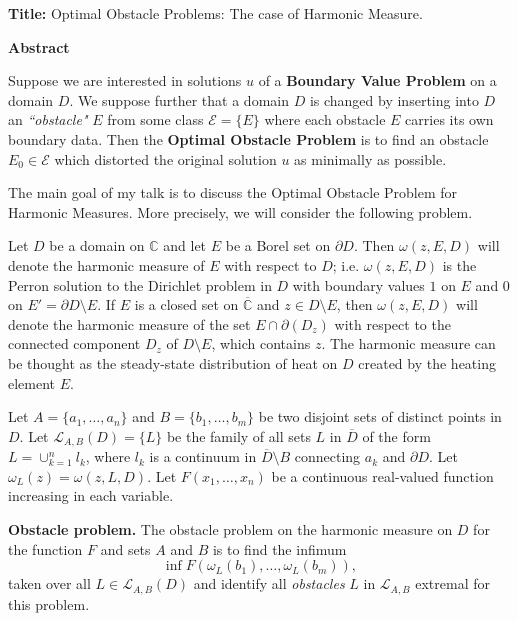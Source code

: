 \documentclass[10pt,a4paper,reqno]{amsart}
\theoremstyle{definition}
\theoremstyle{remark}
\begin{document}
\thispagestyle{empty}

{\Large{\textbf{Title:}}} {\large{Optimal Obstacle Problems: The
case of Harmonic Measure.}}

\bigskip


                 \centerline{{\Large{\textbf{Abstract}}}}
\medskip

\noindent %
Suppose we are interested in solutions $u$ of a \textbf{Boundary
Value Problem }on a domain $D$. We suppose further that a domain
$D$ is changed by inserting into $D$ an \emph{``obstacle"} $E$
from some class $\mathcal{E}=\{E\}$ where each obstacle $E$
carries its own boundary data. Then the \textbf{Optimal Obstacle
Problem} is to find an obstacle $E_0\in \mathcal{E}$ which
distorted the original solution $u$ as minimally as possible.

The main goal of my talk is to discuss the Optimal Obstacle
Problem for Harmonic Measures. More precisely, we will consider
the following problem.



 Let $D$ be a domain on $\mathbb{C}$ and let $E$ be a Borel set on
$\partial D$. Then $\omega(z,E,D)$ will denote the harmonic
measure of $E$ with respect to $D$; i.e. $\omega(z,E,D)$ is the
Perron solution to the Dirichlet problem in $D$ with boundary
values $1$ on $E$ and $0$ on $E'=\partial D\setminus E$. If $E$ is
a closed set on $\overline{\mathbb{C}}$ and $z\in D\setminus E$,
then $\omega(z,E,D)$ will denote the harmonic measure of the set
$E\cap\partial(D_z)$ with respect to the connected component $D_z$
of $D\setminus E$, which contains $z$. The harmonic measure can be
thought as the steady-state distribution of heat on $D$ created by
the heating element $E$.

 Let $A=\{a_1,\ldots,a_n\}$ and $B=\{b_1,\ldots,b_m\}$ be
two disjoint sets of distinct points in $D$. Let
${\mathcal{L}}_{A,B}(D)=\{L\}$ be the family of all  sets $L$ in
$\overline{D}$ of the form $L=\cup_{k=1}^n l_k$, where $l_k$ is a
continuum in $\overline{D}\setminus B$ connecting $a_k$ and
$\partial D$. Let $\omega_L(z)=\omega(z,L,D)$. Let
$F(x_1,\ldots,x_n)$ be a continuous real-valued function
increasing in each variable.

\smallskip

\noindent %
 \textbf{Obstacle problem. } %
 The obstacle problem on the
harmonic measure on $D$ for the function $F$ and sets $A$ and $B$
is to
find the infimum %
$$
 \label{1.1} \inf F(\omega_L(b_1),\ldots,\omega_L(b_m)), %
$$  %
taken over all $L\in {\mathcal{L}}_{A,B}(D)$ and identify all
\textit{obstacles} $L$ in ${\mathcal{L}}_{A,B}$ extremal for this
problem.
\end{document}

